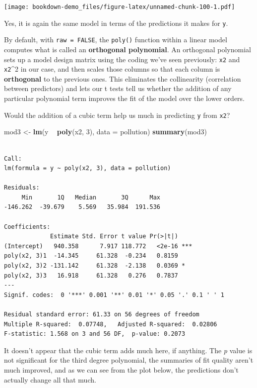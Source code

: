 \documentclass[]{book}
\newenvironment{Shaded}{\begin{snugshade}}{\end{snugshade}}
\newcommand{\KeywordTok}[1]{\textcolor[rgb]{0.13,0.29,0.53}{\textbf{#1}}}
\newcommand{\DataTypeTok}[1]{\textcolor[rgb]{0.13,0.29,0.53}{#1}}
\newcommand{\DecValTok}[1]{\textcolor[rgb]{0.00,0.00,0.81}{#1}}
\newcommand{\StringTok}[1]{\textcolor[rgb]{0.31,0.60,0.02}{#1}}
\newcommand{\OperatorTok}[1]{\textcolor[rgb]{0.81,0.36,0.00}{\textbf{#1}}}
\newcommand{\NormalTok}[1]{#1}
\theoremstyle{definition}
\theoremstyle{definition}
\theoremstyle{definition}
\theoremstyle{remark}
\begin{document}
\texttt{[image: bookdown-demo\_files/figure-latex/unnamed-chunk-100-1.pdf]}

Yes, it is again the same model in terms of the predictions it makes for
\texttt{y}.

By default, with \texttt{raw\ =\ FALSE}, the \texttt{poly()} function
within a linear model computes what is called an \textbf{orthogonal
polynomial}. An orthogonal polynomial sets up a model design matrix
using the coding we've seen previously: \texttt{x2} and \texttt{x2}\^{}2
in our case, and then scales those columns so that each column is
\textbf{orthogonal} to the previous ones. This eliminates the
collinearity (correlation between predictors) and lets our t tests tell
us whether the addition of any particular polynomial term improves the
fit of the model over the lower orders.

Would the addition of a cubic term help us much in predicting \texttt{y}
from \texttt{x2}?

\begin{Shaded}
\begin{Highlighting}[]
\NormalTok{mod3 <-}\StringTok{ }\KeywordTok{lm}\NormalTok{(y }\OperatorTok{~}\StringTok{ }\KeywordTok{poly}\NormalTok{(x2, }\DecValTok{3}\NormalTok{), }\DataTypeTok{data =}\NormalTok{ pollution)}
\KeywordTok{summary}\NormalTok{(mod3)}
\end{Highlighting}
\end{Shaded}

\begin{verbatim}

Call:
lm(formula = y ~ poly(x2, 3), data = pollution)

Residuals:
     Min       1Q   Median       3Q      Max 
-146.262  -39.679    5.569   35.984  191.536 

Coefficients:
             Estimate Std. Error t value Pr(>|t|)    
(Intercept)   940.358      7.917 118.772   <2e-16 ***
poly(x2, 3)1  -14.345     61.328  -0.234   0.8159    
poly(x2, 3)2 -131.142     61.328  -2.138   0.0369 *  
poly(x2, 3)3   16.918     61.328   0.276   0.7837    
---
Signif. codes:  0 '***' 0.001 '**' 0.01 '*' 0.05 '.' 0.1 ' ' 1

Residual standard error: 61.33 on 56 degrees of freedom
Multiple R-squared:  0.07748,   Adjusted R-squared:  0.02806 
F-statistic: 1.568 on 3 and 56 DF,  p-value: 0.2073
\end{verbatim}

It doesn't appear that the cubic term adds much here, if anything. The
\emph{p} value is not significant for the third degree polynomial, the
summaries of fit quality aren't much improved, and as we can see from
the plot below, the predictions don't actually change all that much.
\end{document}
